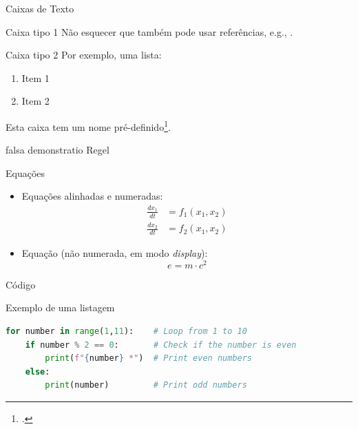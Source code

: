 \documentclass[
aspectratio=169,	%
LETI,				%
english,			%
]{DEEclassP}
\begin{document}
\begin{frame}{Caixas de Texto}
\footnotesize
\begin{block}{Caixa tipo 1}
Não esquecer que também pode usar referências, e.g., .
\end{block}

\begin{alertblock}{Caixa tipo 2}
Por exemplo, uma lista:
\begin{enumerate}
    \item Item 1 
    \item Item 2 
\end{enumerate} 
\end{alertblock}

\begin{examples}
Esta caixa tem um nome pré-definido\footcite{suli2001}. 
\end{examples}

\begin{theorem}
    falsa demonstratio Regel
\end{theorem}
    
\end{frame}

\begin{frame}{Equações}
  	
\begin{itemize}
	\item Equações alinhadas e numeradas:
	\begin{align}
		\frac{dx_1}{dt} &= f_1\left(x_1,x_2\right)\\
		\frac{dx_2}{dt} &= f_2\left(x_1,x_2\right)
	\end{align}
	\vspace{0.3cm}
	\item  Equação (não numerada, em modo \textit{display}): 	
	$$e = m \cdot c^2$$
\end{itemize}  	    

\end{frame}

\begin{frame}[fragile]{Código}

\begin{center}
\begin{minipage}{0.85\textwidth}
\begin{block}{\small{Exemplo de uma listagem}}
\begin{lstlisting}[language=Python]
for number in range(1,11):    # Loop from 1 to 10
    if number % 2 == 0:       # Check if the number is even
        print(f"{number} *")  # Print even numbers
    else:
        print(number)         # Print odd numbers
\end{lstlisting}
\end{block}
\end{minipage}
\end{center}

\end{frame}
\end{document}
